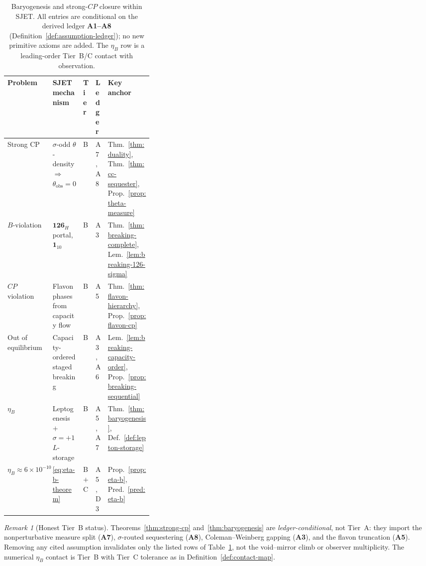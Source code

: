 \documentclass[11pt]{article}
\theoremstyle{plain}
\theoremstyle{definition}
\theoremstyle{remark}
\newtheorem{remark}[theorem]{Remark}
\numberwithin{equation}{section}
\begin{document}
\begin{table}[ht]
\centering
\small
\renewcommand{\arraystretch}{1.14}
\begin{tabular}{@{}llllp{0.34\linewidth}@{}}
\toprule
\textbf{Problem} & \textbf{SJET mechanism} & \textbf{Tier} &
\textbf{Ledger} & \textbf{Key anchor} \\
\midrule
Strong CP &
  $\sigma$-odd $\theta$-density $\Rightarrow$
  $\theta_{\mathrm{obs}}=0$ &
  B &
  A7, A8 &
  Thm.~\ref{thm:duality},
  Thm.~\ref{thm:cc-sequester},
  Prop.~\ref{prop:theta-measure} \\
\addlinespace
$B$-violation &
  $\mathbf{126}_H$ portal, $\mathbf{1}_{10}$ &
  B &
  A3 &
  Thm.~\ref{thm:breaking-complete},
  Lem.~\ref{lem:breaking-126-sigma} \\
\addlinespace
$CP$ violation &
  Flavon phases from capacity flow &
  B &
  A5 &
  Thm.~\ref{thm:flavon-hierarchy},
  Prop.~\ref{prop:flavon-cp} \\
\addlinespace
Out of equilibrium &
  Capacity-ordered staged breaking &
  B &
  A3, A6 &
  Lem.~\ref{lem:breaking-capacity-order},
  Prop.~\ref{prop:breaking-sequential} \\
\addlinespace
$\eta_B$ &
  Leptogenesis $+$ $\sigma=+1$ $L$-storage &
  B &
  A5, A7 &
  Thm.~\ref{thm:baryogenesis},
  Def.~\ref{def:lepton-storage} \\
\addlinespace
$\eta_B\approx 6\times 10^{-10}$ &
  \eqref{eq:eta-b-theorem} &
  B $+$ C &
  A5, D3 &
  Prop.~\ref{prop:eta-b},
  Pred.~\ref{pred:eta-b} \\
\bottomrule
\end{tabular}
\caption{Baryogenesis and strong-$CP$ closure within SJET. All entries are
conditional on the derived ledger \textbf{A1--A8}
(Definition~\ref{def:assumption-ledger}); no new primitive axioms are added.
The $\eta_B$ row is a leading-order Tier~B/C contact with observation.}
\label{tab:baryogenesis}
\end{table}

\begin{remark}[Honest Tier~B status]
Theorems~\ref{thm:strong-cp} and~\ref{thm:baryogenesis} are
\emph{ledger-conditional}, not Tier~A: they import the nonperturbative measure
split (\textbf{A7}), $\sigma$-routed sequestering (\textbf{A8}), Coleman--Weinberg
gapping (\textbf{A3}), and the flavon truncation (\textbf{A5}). Removing any
cited assumption invalidates only the listed rows of
Table~\ref{tab:baryogenesis}, not the void--mirror climb or observer
multiplicity. The numerical $\eta_B$ contact is Tier~B with Tier~C tolerance
as in Definition~\ref{def:contact-map}.
\end{remark}%
\end{document}
